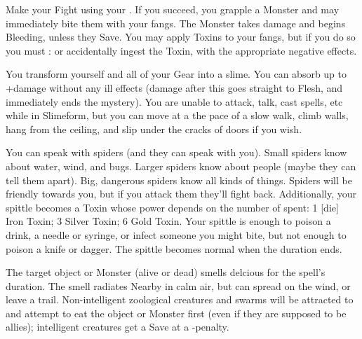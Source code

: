 {\MYSTERY [
  Name = Serpent's Fang,
  Link = arcana-mystery-serpents-fang,
  Paradigm = Biomancy,
  Save = n/a,
  Duration = Combat or \SUM Minutes,
  Target = Self
]

Make your Fight \RO using your \FOC.  If you succeed, you grapple a Monster and may immediately bite them with your fangs.  The Monster takes \DICE damage and begins Bleeding, unless they Save.  You may apply Toxins to your fangs, but if you do so you must \RS : \FOC or accidentally ingest the Toxin, with the appropriate negative effects.

\MYSTERY [
  Name = Slimeform,
  Link = arcana-mystery-slimeform,
  Paradigm = Biomancy,
  Save = n/a,
  Duration = \SUM Minutes,
  Target = Self
]

You transform yourself and all of your Gear into a slime.  You can absorb up to \SUMDICE+\DICE damage without any ill effects (damage after this goes straight to Flesh, and immediately ends the mystery).  You are unable to attack, talk, cast spells, etc while in Slimeform, but you can move at a the pace of a slow walk, climb walls, hang from the ceiling, and slip under the cracks of doors if you wish.

\MYSTERY [
  Name = Spidertongue,
  Link = arcana-mystery-spidertongue,
  Paradigm = Biomancy,
  Save = Y (neg.),
  Duration = Combat or \SUM Minutes,
  Target = Self
]

You can speak with spiders (and they can speak with you).  Small spiders know about water, wind, and bugs.  Larger spiders know about people (maybe they can tell them apart).  Big, dangerous spiders know all kinds of things.  Spiders will be friendly towards you, but if you attack them they'll fight back.  Additionally, your spittle becomes a Toxin whose power depends on the number of \DICE spent: 1 [die] Iron Toxin; 3 \DICE Silver Toxin; 6 \DICE Gold Toxin.  Your spittle is enough to poison a drink, a needle or syringe, or infect someone you might bite, but not enough to poison a knife or dagger.  The spittle becomes normal when the duration ends.

\MYSTERY [
  Name = Tasty,
  Link = arcana-mystery-tasty,
  Paradigm = Biomancy,
  Save = N,
  Duration = Combat or \SUM Minutes,
  Target = Close Target(s)
]

The target object or Monster (alive or dead) smells delcious for the spell's duration.  The smell radiates Nearby in calm air, but can spread on the wind, or leave a trail.  Non-intelligent zoological creatures and swarms will be attracted to and attempt to eat the object or Monster first (even if they are supposed to be allies); intelligent creatures get a Save at a -\DICE penalty. 

}
